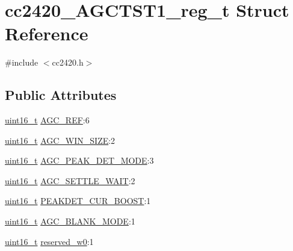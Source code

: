 \hypertarget{structcc2420___a_g_c_t_s_t1__reg__t}{}\section{cc2420\+\_\+\+A\+G\+C\+T\+S\+T1\+\_\+reg\+\_\+t Struct Reference}
\label{structcc2420___a_g_c_t_s_t1__reg__t}


{\ttfamily \#include $<$cc2420.\+h$>$}

\subsection*{Public Attributes}
\begin{DoxyCompactItemize}
\item 
\hyperlink{_p_e___types_8h_a1f1825b69244eb3ad2c7165ddc99c956}{uint16\+\_\+t} \hyperlink{structcc2420___a_g_c_t_s_t1__reg__t_a4716ca2a3a80510f8d62d76229cb4f98}{A\+G\+C\+\_\+\+R\+EF}\+:6
\item 
\hyperlink{_p_e___types_8h_a1f1825b69244eb3ad2c7165ddc99c956}{uint16\+\_\+t} \hyperlink{structcc2420___a_g_c_t_s_t1__reg__t_a970f9ec65051477b1b404dc67c7238d1}{A\+G\+C\+\_\+\+W\+I\+N\+\_\+\+S\+I\+ZE}\+:2
\item 
\hyperlink{_p_e___types_8h_a1f1825b69244eb3ad2c7165ddc99c956}{uint16\+\_\+t} \hyperlink{structcc2420___a_g_c_t_s_t1__reg__t_ab5be46c38f1ccc6e54d15779b3d5c647}{A\+G\+C\+\_\+\+P\+E\+A\+K\+\_\+\+D\+E\+T\+\_\+\+M\+O\+DE}\+:3
\item 
\hyperlink{_p_e___types_8h_a1f1825b69244eb3ad2c7165ddc99c956}{uint16\+\_\+t} \hyperlink{structcc2420___a_g_c_t_s_t1__reg__t_a11d5da84b8e069ce8131ecd78ab8edb5}{A\+G\+C\+\_\+\+S\+E\+T\+T\+L\+E\+\_\+\+W\+A\+IT}\+:2
\item 
\hyperlink{_p_e___types_8h_a1f1825b69244eb3ad2c7165ddc99c956}{uint16\+\_\+t} \hyperlink{structcc2420___a_g_c_t_s_t1__reg__t_a458bec3f150590932755c1dc4e360764}{P\+E\+A\+K\+D\+E\+T\+\_\+\+C\+U\+R\+\_\+\+B\+O\+O\+ST}\+:1
\item 
\hyperlink{_p_e___types_8h_a1f1825b69244eb3ad2c7165ddc99c956}{uint16\+\_\+t} \hyperlink{structcc2420___a_g_c_t_s_t1__reg__t_a271e79cee89b57786a55f7dd33414ed3}{A\+G\+C\+\_\+\+B\+L\+A\+N\+K\+\_\+\+M\+O\+DE}\+:1
\item 
\hyperlink{_p_e___types_8h_a1f1825b69244eb3ad2c7165ddc99c956}{uint16\+\_\+t} \hyperlink{structcc2420___a_g_c_t_s_t1__reg__t_a01bd3547c8fb510471c118f2f4bb4983}{reserved\+\_\+w0}\+:1
\end{DoxyCompactItemize}


